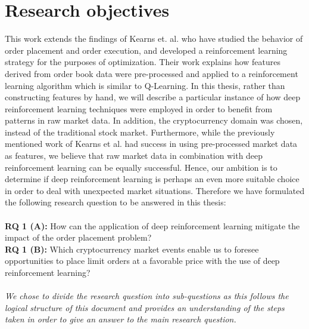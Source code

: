 \section{Research objectives}

This work extends the findings of Kearns et. al. who have studied the behavior of order placement and order execution\cite{nevmyvaka2005electronic}, and developed a reinforcement learning strategy\cite{nevmyvaka2006reinforcement} for the purposes of optimization.
Their work explains how features derived from order book data were pre-processed and applied to a reinforcement learning algorithm which is similar to Q-Learning.
In this thesis, rather than constructing features by hand, we will describe a particular instance of how deep reinforcement learning techniques were employed in order to benefit from patterns in raw market data.
In addition, the cryptocurrency domain was chosen, instead of the traditional stock market.
Furthermore, while the previously mentioned work of Kearns et al. had success in using pre-processed market data as features, we believe that raw market data in combination with deep reinforcement learning can be equally successful.
Hence, our ambition is to determine if deep reinforcement learning is perhaps an even more suitable choice in order to deal with unexpected market situations.
Therefore we have formulated the following research question to be answered in this thesis:
\\
\\
\textbf{RQ 1 (A):} How can the application of deep reinforcement learning mitigate the impact of the order placement problem?
\\
\textbf{RQ 1 (B):} Which cryptocurrency market events enable us to foresee opportunities to place limit orders at a favorable price with the use of deep reinforcement learning?
\\
\\
\textit{We chose to divide the research question into sub-questions as this follows the logical structure of this document and provides an understanding of the steps taken in order to give an answer to the main research question.}

